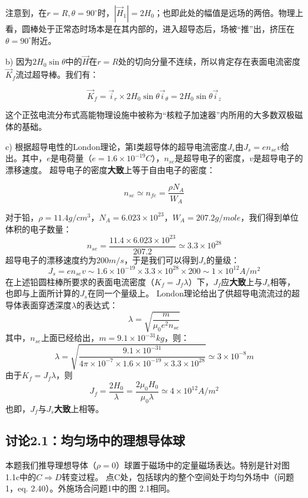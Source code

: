 注意到，在$r=R,\theta=90^\circ$时，$|\vec{H}_1|=2H_0$；也即此处的幅值是远场的两倍。物理上看，圆棒处于正常态时场本是在其内部的，进入超导态后，场被“推”出，挤压在$\theta=90^\circ$附近。


b) 因为$2H_0\sin \theta$中的$\vec{H}$在$r=R$处的切向分量不连续，所以肯定存在表面电流密度$\vec{K}_f$流过超导棒。我们有：

\begin{equation}
  \vec{K}_f=\vec{i}_r \times 2H_0\sin\theta \vec{i}_\theta=2H_0\sin\theta\vec{i}_z
\end{equation}

这个正弦电流分布式高能物理设施中被称为“核粒子加速器”内所用的大多数双极磁体的基础。


c) 根据超导电性的London理论，第I类超导体的超导电流密度$J_s$由$J_s=en_{se}v$给出。其中，$e$是电荷量（$e=1.6\times 10^{-19}C$），$n_{se}$是超导电子的密度，$v$是超导电子的漂移速度。
超导电子的密度\textbf{大致}上等于自由电子的密度：

\begin{equation}
n_{se}\simeq n_{fe}=\frac{\rho N_A}{W_A}
\end{equation}

对于铅，$\rho=11.4 g/cm^3，N_A=6.023\times 10^{23}，W_A=207.2 g/mole$，我们得到单位体积的电子数量：
$$
n_{se}=\frac{11.4\times 6.023\times 10^{23}}{207.2} \simeq 3.3\times 10^{28}
$$
超导电子的漂移速度约为$200m/s$，于是我们可以得到$J_s$的量级：
$$
J_s=e n_{se} v\sim 1.6\times 10^{-19} \times 3.3\times 10^{28} \times 200 \sim 1\times 10^{12} A/m^2
$$
在上述铅圆柱棒所要求的表面电流密度（$K_f=J_f \lambda$）下，$J_f$应\textbf{大致}上与$J_s$相等，也即与上面所计算的$J_s$在同一个量级上。
London理论给出了供超导电流流过的超导体表面穿透深度$\lambda$的表达式：
$$
\lambda=\sqrt{\frac{m}{\mu_0 e^2 n_{se}}}
$$
其中，$n_{se}$上面已经给出，$m=9.1\times 10^{-31} kg$，则：
$$
\lambda=\sqrt{\frac{9.1\times 10^{-31}}{4\pi \times 10^{-7}\times 1.6\times 10^{-19}\times 3.3\times 10^{28}}}\simeq 3\times 10^{-8} m
$$
由于$K_f=J_f\lambda$，则
$$
J_f=\frac{2H_0}{\lambda}=\frac{2\mu_0 H_0}{\mu_0 \lambda}\simeq 4\times 10^{12} A/m^2
$$
也即，$J_f$与$J_s$\textbf{大致}上相等。


\subsection{讨论2.1：均匀场中的理想导体球}
本题我们推导理想导体（$\rho=0$）球置于磁场中的定量磁场表达。特别是针对图 1.1c中的$C\Rightarrow D$转变过程。
点C处，包括球内的整个空间处于均匀外场中（问题1，eq. 2.40）。外施场合问题1中的图 2.1相同。

